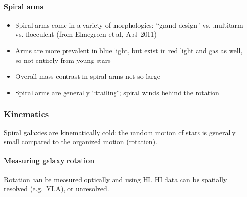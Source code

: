\documentclass{article}
\begin{document}
\paragraph{Spiral arms}
\begin{itemize}
    \item Spiral arms come in a variety of morphologies: ``grand-design'' vs.
        multitarm vs. flocculent (from Elmegreen et al, ApJ 2011)
    \item Arms are more prevalent in blue light, but exist in red light and gas
        as well, so not entirely from young stars
    \item Overall mass contrast in spiral arms not so large
    \item Spiral arms are generally ``trailing"; spiral winds behind the
        rotation
\end{itemize}

\subsubsection{Kinematics}
Spiral galaxies are kinematically cold: the random motion of
stars is generally small compared to the organized motion (rotation).

\paragraph{Measuring galaxy rotation}
Rotation can be measured optically and using HI. HI data can be spatially
resolved (e.g.\ VLA), or unresolved.
\end{document}
